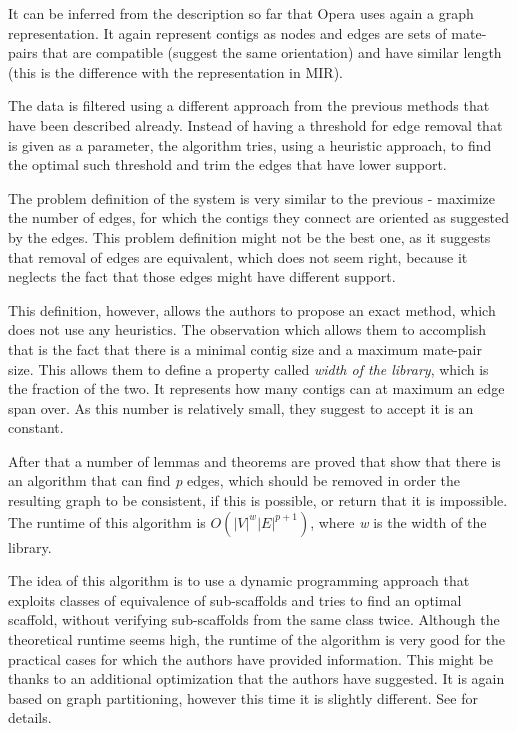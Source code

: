 \documentclass[11pt]{article}
\begin{document}
It can be inferred from the description so far that Opera uses again a graph
representation. It again represent contigs as nodes and edges are sets of
mate-pairs that are compatible (suggest the same orientation) and have similar
length (this is the difference with the representation in MIR).

The data is filtered using a different approach from the previous methods that
have been described already. Instead of having a threshold for edge removal
that is given as a parameter, the algorithm tries, using a heuristic approach,
to find the optimal such threshold and trim the edges that have lower support.

The problem definition of the system is very similar to the previous - maximize
the number of edges, for which the contigs they connect are oriented as
suggested by the edges. This problem definition might not be the best one, as it
suggests that removal of edges are equivalent, which does not seem right,
because it neglects the fact that those edges might have different support.

This definition, however, allows the authors to propose an exact method, which
does not use any heuristics. The observation which allows them to accomplish
that is the fact that there is a minimal contig size and a maximum mate-pair size.
This allows them to define a property called \emph{width of the library}, which
is the fraction of the two. It represents how many contigs can at maximum an
edge span over. As this number is relatively small, they suggest to accept it is
an constant.

After that a number of lemmas and theorems are proved that show that there is an
algorithm that can find \emph{p} edges, which should be removed in order the
resulting graph to be consistent, if this is possible, or return that it is
impossible. The runtime of this algorithm is $O(|V|^w |E|^{p + 1})$, where
\emph{w} is the width of the library.

The idea of this algorithm is to use a dynamic programming approach that
exploits classes of equivalence of sub-scaffolds and tries to find an optimal
scaffold, without verifying sub-scaffolds from the same class twice. Although
the theoretical runtime seems high, the runtime of the algorithm is very good
for the practical cases for which the authors have provided information. This
might be thanks to an additional optimization that the authors have suggested.
It is again based on graph partitioning, however this time it is slightly
different. See \cite{Opera} for details.
\end{document}
